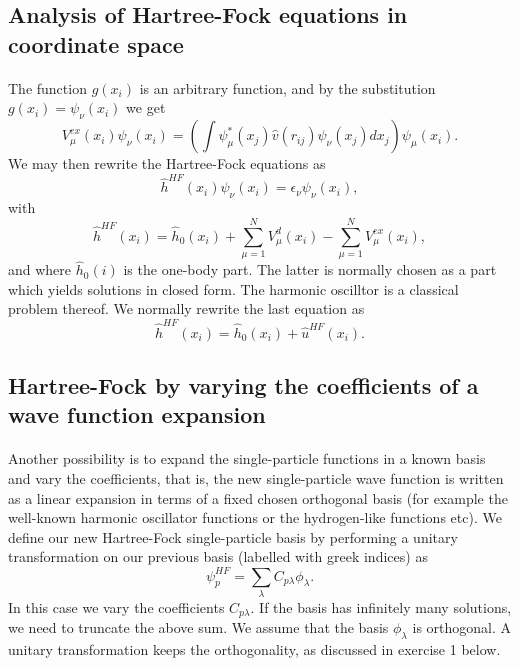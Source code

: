 \documentclass[%
twoside,                 %
final,                   %
10pt]{article}
\begin{document}
\subsection*{Analysis of Hartree-Fock equations in coordinate space}

\paragraph{}
The function $g(x_i)$ is an arbitrary function,
and by the substitution $g(x_i) = \psi_{\nu}(x_i)$
we get
\begin{equation*}
  V_{\mu}^{ex}(x_i) \psi_{\nu}(x_i) 
  = \left(\int \psi_{\mu}^*(x_j) 
 \hat{v}(r_{ij})\psi_{\nu}(x_j)
  dx_j\right)\psi_{\mu}(x_i).
\end{equation*}
We may then rewrite the Hartree-Fock equations as
\[
  \hat{h}^{HF}(x_i) \psi_{\nu}(x_i) = \epsilon_{\nu}\psi_{\nu}(x_i),
\]
with
\[
  \hat{h}^{HF}(x_i)= \hat{h}_0(x_i) + \sum_{\mu=1}^NV_{\mu}^{d}(x_i) -
  \sum_{\mu=1}^NV_{\mu}^{ex}(x_i),
\]
and where $\hat{h}_0(i)$ is the one-body part. The latter is normally chosen as a part which yields solutions in closed form. The harmonic oscilltor is a classical problem thereof.
We normally rewrite the last equation as
\[
  \hat{h}^{HF}(x_i)= \hat{h}_0(x_i) + \hat{u}^{HF}(x_i). 
\]




\subsection*{Hartree-Fock by varying the coefficients of a wave function expansion}

\paragraph{}
Another possibility is to expand the single-particle functions in a known basis  and vary the coefficients, 
that is, the new single-particle wave function is written as a linear expansion
in terms of a fixed chosen orthogonal basis (for example the well-known harmonic oscillator functions or the hydrogen-like functions etc).
We define our new Hartree-Fock single-particle basis by performing a unitary transformation 
on our previous basis (labelled with greek indices) as
\begin{equation}
\psi_p^{HF}  = \sum_{\lambda} C_{p\lambda}\phi_{\lambda}. \label{eq:newbasis}
\end{equation}
In this case we vary the coefficients $C_{p\lambda}$. If the basis has infinitely many solutions, we need
to truncate the above sum.  We assume that the basis $\phi_{\lambda}$ is orthogonal. A unitary transformation keeps the orthogonality, as discussed in exercise 1 below.
\end{document}
